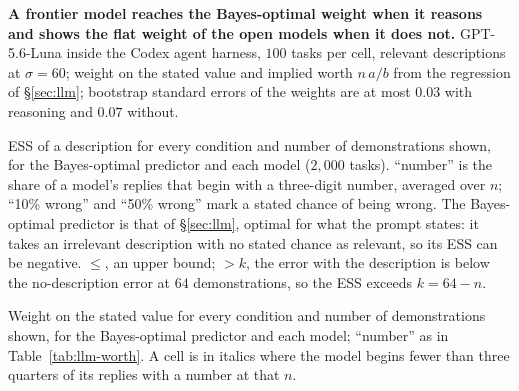 \documentclass{article}
\begin{document}
\begin{table}[!htb]
\centering\small
\caption{\textbf{A frontier model reaches the Bayes-optimal weight when it reasons and shows the flat weight of the open models when it does not.} GPT-5.6-Luna inside the Codex agent harness, $100$ tasks per cell, relevant descriptions at $\sigma = 60$; weight on the stated value and implied worth $n\,a/b$ from the regression of \S\ref{sec:llm}; bootstrap standard errors of the weights are at most $0.03$ with reasoning and $0.07$ without.}
\label{tab:agent}
\vspace{3pt}

\end{table}


\begin{table}[p]
\centering\scriptsize
\setlength{\tabcolsep}{3pt}
\caption{ESS of a description for every condition and number of demonstrations shown, for the Bayes-optimal predictor and each model ($2{,}000$ tasks). ``number'' is the share of a model's replies that begin with a three-digit number, averaged over $n$; ``10\% wrong'' and ``50\% wrong'' mark a stated chance of being wrong. The Bayes-optimal predictor is that of \S\ref{sec:llm}, optimal for what the prompt states: it takes an irrelevant description with no stated chance as relevant, so its ESS can be negative. $\leq$, an upper bound; $> k$, the error with the description is below the no-description error at $64$ demonstrations, so the ESS exceeds $k = 64 - n$.}
\label{tab:llm-worth}
\vspace{3pt}

\end{table}

\begin{table}[p]
\centering\scriptsize
\setlength{\tabcolsep}{3pt}
\caption{Weight on the stated value for every condition and number of demonstrations shown, for the Bayes-optimal predictor and each model; ``number'' as in Table~\ref{tab:llm-worth}. A cell is in italics where the model begins fewer than three quarters of its replies with a number at that $n$.}
\label{tab:llm-full}
\vspace{3pt}

\end{table}
\end{document}
